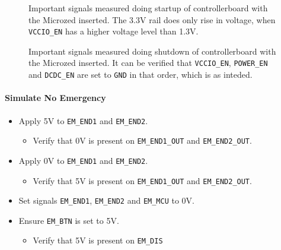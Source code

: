 \begin{figure}[h]
	\centering
	
	\caption[Signals measured doing startup of controllerboard.]{Important signals measured doing startup of controllerboard with the Microzed inserted. The 3.3V rail does only rise in voltage, when \texttt{VCCIO\_EN} has a higher voltage level than 1.3V.}
	\label{fig:controllerboardv2_startup}
\end{figure}

\begin{figure}[h]
	\centering
    
	\caption[Signals measured doing shutdown of controllerboard.]{Important signals measured doing shutdown of controllerboard with the Microzed inserted. It can be verified that \texttt{VCCIO\_EN}, \texttt{POWER\_EN} and \texttt{DCDC\_EN} are set to \texttt{GND} in that order, which is as inteded.}
	\label{fig:controllerboardv2_shutdown}
\end{figure}
\paragraph{Simulate No Emergency} %
\label{par:simulate_no_emergency}
\begin{itemize}
	\item Apply 5V to \texttt{EM\_END1} and \texttt{EM\_END2}.
	\begin{itemize}
		\item[\cmark] Verify that 0V is present on \texttt{EM\_END1\_OUT} and \texttt{EM\_END2\_OUT}.
	\end{itemize}
	\item Apply 0V to \texttt{EM\_END1} and \texttt{EM\_END2}.
	\begin{itemize}
		\item[\cmark] Verify that 5V is present on \texttt{EM\_END1\_OUT} and \texttt{EM\_END2\_OUT}.
	\end{itemize}
	\item Set signals \texttt{EM\_END1}, \texttt{EM\_END2} and \texttt{EM\_MCU} to 0V.
	\item Ensure \texttt{EM\_BTN} is set to 5V.
	\begin{itemize}
		\item[\cmark] Verify that 5V is present on \texttt{EM\_DIS}
	\end{itemize}
\end{itemize}
